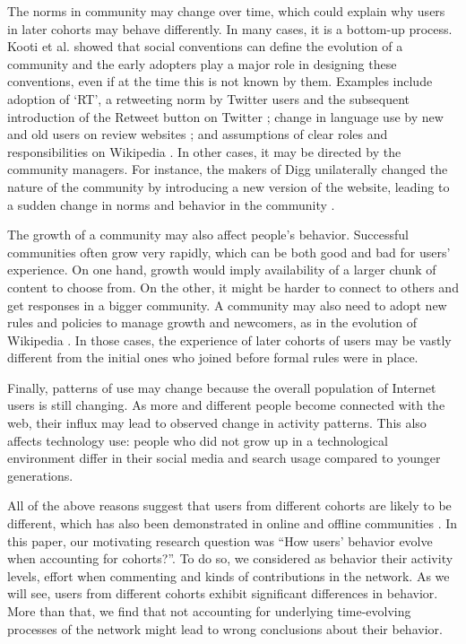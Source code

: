 The norms in community may change over time, which could explain why users in later cohorts may behave differently. In many cases, it is a bottom-up process. Kooti et al. \cite{Kooti2010} showed that social conventions can define the evolution of a community and the early adopters play a major role in designing these conventions, even if at the time this is not known by them. Examples include adoption of `RT', a retweeting norm by Twitter users and the subsequent introduction of the Retweet button on Twitter \cite{Kooti2010}; change in language use by new and old users on review websites \cite{Danescu-niculescu-mizil2013}; and assumptions of clear roles and responsibilities on Wikipedia \cite{Kittur2007a}. In other cases, it may be directed by the community managers. For instance, the makers of Digg unilaterally changed the nature of the community by introducing a new version of the website, leading to a sudden change in norms and behavior in the community \cite{Ingram2014,Lardinois2014}. 

The growth of a community may also affect people's behavior. Successful communities often grow very rapidly, which can be both good and bad for users' experience. On one hand, growth would imply availability of a larger chunk of content to choose from. On the other, it might be harder to connect to others and get responses in a bigger community. A community may also need to adopt new rules and policies to manage growth and newcomers, as in the evolution of Wikipedia \cite{Choi2010,Bryant2005}. In those cases, the experience of later cohorts of users may be vastly different from the initial ones who joined before formal rules were in place. 

Finally, patterns of use may change because the overall population of Internet users is still changing. As more and different people become connected with the web, their influx may lead to observed change in activity patterns.  This also affects technology use: people who did not grow up in a technological environment differ in their social media and search usage compared to younger generations\cite{Correa2010,Beldona2005}. 

All of the above reasons suggest that users from different cohorts are likely to be different, which has also been demonstrated in online and offline communities \cite{Ryder1965,Danescu-niculescu-mizil2013,Prensky2001,Correa2010}. In this paper, our motivating research question was ``How users' behavior evolve when accounting for cohorts?''. To do so, we considered as behavior their activity levels, effort when commenting and kinds of contributions in the network. As we will see, users from different cohorts exhibit significant differences in behavior. More than that, we find that not accounting for underlying time-evolving processes of the network might lead to wrong conclusions about their behavior.

